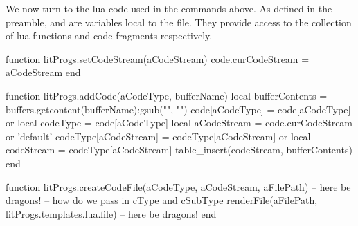 We now turn to the lua code used in the \type{\directlua} commands above. 
As defined in the preamble,  and  are variables 
local to the  file. They provide access to the 
collection of lua functions and code fragments respectively. 

\startLuaCode
function litProgs.setCodeStream(aCodeStream)
  code.curCodeStream = aCodeStream  
end

function litProgs.addCode(aCodeType, bufferName)
  local bufferContents  =
    buffers.getcontent(bufferName):gsub("", "\n")
  code[aCodeType]       = code[aCodeType] or { }
  local codeType        = code[aCodeType]
  local aCodeStream     = code.curCodeStream or 'default'
  codeType[aCodeStream] = codeType[aCodeStream] or { }
  local codeStream      = codeType[aCodeStream]
  table_insert(codeStream, bufferContents)
end

function litProgs.createCodeFile(aCodeType,
                                 aCodeStream,
                                 aFilePath)
  -- here be dragons! -- how do we pass in cType and cSubType
  renderFile(aFilePath, litProgs.templates.lua.file)
  -- here be dragons!
end
\stopLuaCode

\stopchapter